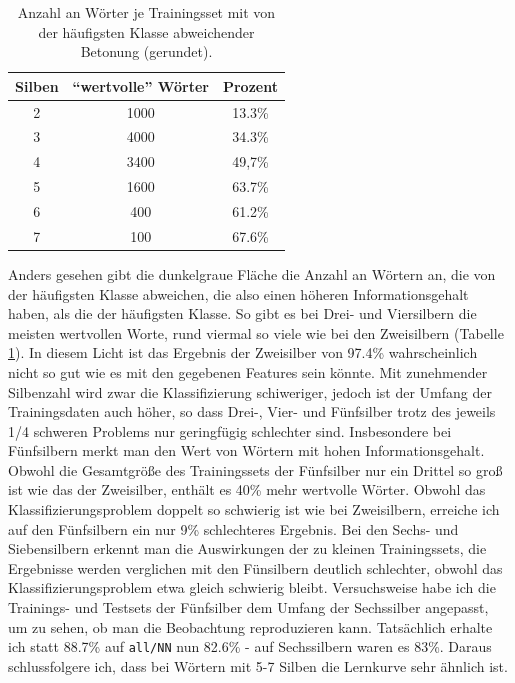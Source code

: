 \begin{table}[h]
\centering
\caption{Anzahl an Wörter je Trainingsset mit von der häufigsten Klasse abweichender Betonung (gerundet).}
\label{table:wertvolle_woerter}
\begin{tabular}{|ccc|}\hline
{\bf Silben} & {\bf \enquote{wertvolle} Wörter} & {\bf Prozent} \\\hline
2            & 1000                     & 13.3\%   \\
3            & 4000                     & 34.3\%   \\
4            & 3400                     & 49,7\%   \\
5            & 1600                     & 63.7\%   \\
6            & 400                      & 61.2\%   \\
7            & 100                      & 67.6\%   \\\hline
\end{tabular}
\end{table}
Anders gesehen gibt die dunkelgraue Fläche die Anzahl an Wörtern an, die von der häufigsten Klasse abweichen, die also einen höheren Informationsgehalt haben, als die der häufigsten Klasse. So gibt es bei Drei- und Viersilbern die meisten wertvollen Worte, rund viermal so viele wie bei den Zweisilbern (Tabelle \ref{table:wertvolle_woerter}). In diesem Licht ist das Ergebnis der Zweisilber von 97.4\% wahrscheinlich nicht so gut wie es mit den gegebenen Features sein könnte. Mit zunehmender Silbenzahl wird zwar die Klassifizierung schiweriger, jedoch ist der Umfang der Trainingsdaten auch höher, so dass Drei-, Vier- und Fünfsilber trotz des jeweils 1/4 schweren Problems nur geringfügig schlechter sind. Insbesondere bei Fünfsilbern merkt man den Wert von Wörtern mit hohen Informationsgehalt. Obwohl die Gesamtgröße des Trainingssets der Fünfsilber nur ein Drittel so groß ist wie das der Zweisilber, enthält es 40\% mehr wertvolle Wörter. Obwohl das Klassifizierungsproblem doppelt so schwierig ist wie bei Zweisilbern, erreiche ich auf den Fünfsilbern ein nur 9\% schlechteres Ergebnis. Bei den Sechs- und Siebensilbern erkennt man die Auswirkungen der zu kleinen Trainingssets, die Ergebnisse werden verglichen mit den Fünsilbern deutlich schlechter, obwohl das Klassifizierungsproblem etwa gleich schwierig bleibt. Versuchsweise habe ich die Trainings- und Testsets der Fünfsilber dem Umfang der Sechssilber angepasst, um zu sehen, ob man die Beobachtung reproduzieren kann. Tatsächlich erhalte ich statt 88.7\% auf \texttt{all/NN} nun 82.6\% - auf Sechssilbern waren es 83\%. Daraus schlussfolgere ich, dass bei Wörtern mit 5-7 Silben die Lernkurve sehr ähnlich ist.

